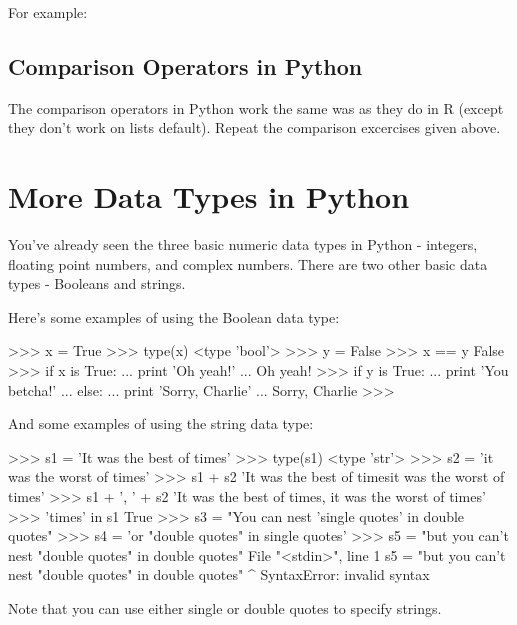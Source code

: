 For example:
%

\subsection{Comparison Operators in Python}

The comparison operators in Python work the same was as they do in R
(except they don't work on lists default). Repeat the comparison
excercises given above.

\section{More Data Types in Python}

You've already seen the three basic numeric data types in Python -
integers, floating point numbers, and complex numbers. There are two
other basic data types - Booleans and strings.

Here's some examples of using the Boolean data type:

\begin{python}
>>> x = True
>>> type(x)
<type 'bool'>
>>> y = False
>>> x == y
False
>>> if x is True:
...     print 'Oh yeah!'
... 
Oh yeah!
>>> if y is True:
...     print 'You betcha!'
... else:
...     print 'Sorry, Charlie'
... 
Sorry, Charlie
>>>
\end{python}
%
And some examples of using the string data type:
%
\begin{python}
>>> s1 = 'It was the best of times'
>>> type(s1)
<type 'str'>
>>> s2 = 'it was the worst of times'
>>> s1 + s2
'It was the best of timesit was the worst of times'
>>> s1 + ', ' + s2
'It was the best of times, it was the worst of times'
>>> 'times' in s1
True
>>> s3 = "You can nest 'single quotes' in double quotes"
>>> s4 = 'or "double quotes" in single quotes'
>>> s5 = "but you can't nest "double quotes" in double quotes"
  File "<stdin>", line 1
    s5 = "but you can't nest "double quotes" in double quotes"
                                   ^
SyntaxError: invalid syntax
\end{python}
%
Note that you can use either single or double quotes to specify strings.

